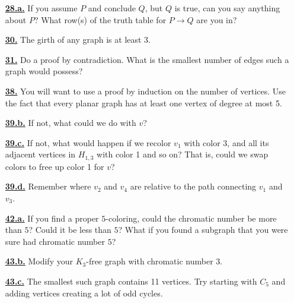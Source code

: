 \documentclass[10pt,]{book}
\theoremstyle{plain}
\theoremstyle{definition}
\theoremstyle{definition}
\theoremstyle{definition}
\numberwithin{equation}{chapter}
\def\imp{\rightarrow}
\begin{document}
\begin{itemize}[itemsep=1em]
\hypertarget{a-28.a}{}\item[\textbf{\hyperref[task-37]{28.a.}}]
\hypertarget{p-280}{}%
If you assume \(P\) and conclude \(Q\), but \(Q\) is true, can you say anything about \(P\)?  What row(s) of the truth table for \(P \imp Q\) are you in?%

\hypertarget{a-30}{}\item[\textbf{\hyperref[activity-25]{30.}}]
\hypertarget{p-292}{}%
The girth of any graph is at least 3.%

\hypertarget{a-31}{}\item[\textbf{\hyperref[act-planardeg5]{31.}}]
\hypertarget{p-295}{}%
Do a proof by contradiction.  What is the smallest number of edges such a graph would possess?%

\hypertarget{a-38}{}\item[\textbf{\hyperref[activity-31]{38.}}]
\hypertarget{p-350}{}%
You will want to use a proof by induction on the number of vertices.  Use the fact that every planar graph has at least one vertex of degree at most 5.%

\hypertarget{a-39.b}{}\item[\textbf{\hyperref[task-49]{39.b.}}]
\hypertarget{p-355}{}%
If not, what could we do with \(v\)?%

\hypertarget{a-39.c}{}\item[\textbf{\hyperref[task-50]{39.c.}}]
\hypertarget{p-357}{}%
If not, what would happen if we recolor \(v_1\) with color 3, and all its adjacent vertices in \(H_{1,3}\) with color 1 and so on?  That is, could we swap colors to free up color 1 for \(v\)?%

\hypertarget{a-39.d}{}\item[\textbf{\hyperref[task-51]{39.d.}}]
\hypertarget{p-359}{}%
Remember where \(v_2\) and \(v_4\) are relative to the path connecting \(v_1\) and \(v_3\).%

\hypertarget{a-42.a}{}\item[\textbf{\hyperref[task-52]{42.a.}}]
\hypertarget{p-373}{}%
If you find a proper \(5\)-coloring, could the chromatic number be more than \(5\)?  Could it be less than \(5\)?  What if you found a subgraph that you were sure had chromatic number \(5\)?%

\hypertarget{a-43.b}{}\item[\textbf{\hyperref[task-56]{43.b.}}]
\hypertarget{p-379}{}%
Modify your \(K_3\)-free graph with chromatic number 3.%

\hypertarget{a-43.c}{}\item[\textbf{\hyperref[task-57]{43.c.}}]
\hypertarget{p-381}{}%
The smallest such graph contains 11 vertices.  Try starting with \(C_5\) and adding vertices creating a lot of odd cycles.%


\end{itemize}
\end{document}
